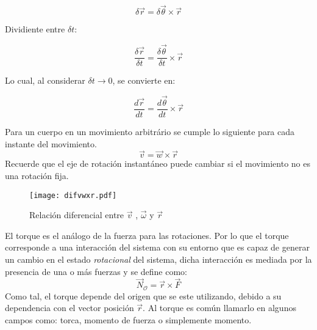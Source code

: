 \documentclass[/home/hernan-barquero/Documents/Apuntes_mecanica_teorica/main.tex]{subfiles}
\begin{document}
	\begin{equation*}
		\delta \vec{r} = \delta \vec{\theta} \times \vec{r}
	\end{equation*}

	Dividiente entre $\delta t$:

	\begin{equation*}
		\frac{\delta \vec{r}}{\delta t} =\frac{\delta \vec{\theta}}{\delta t}  \times \vec{r}
	\end{equation*}

	Lo cual, al considerar $\delta t \rightarrow 0$, se convierte en:

	\begin{equation*}
		\frac{d \vec{r}}{dt} = \frac{d \vec{\theta}}{dt} \times \vec{r}
	\end{equation*}

	\begin{definition}
		Para un cuerpo en un movimiento arbitrário se cumple lo siguiente para cada instante del movimiento.
		\begin{equation}
			\vec{v} = \vec{w} \times \vec{r}
			\label{eq: vwrelation}
		\end{equation}
		Recuerde que el eje de rotación instantáneo puede cambiar si el movimiento no es una rotación fija.
	\end{definition}


	\begin{marginfigure}
		\begin{figure}[H]
			\texttt{[image: difvwxr.pdf]}
			\caption{Relación diferencial entre $\vec{v}$ , $\vec{\omega}$ y $\vec{r}$}
			\label{fig: difvwxr}
		\end{figure}
	\end{marginfigure}

	\begin{definition}
		El torque es el análogo de la fuerza para las rotaciones. Por lo que el torque corresponde a una interacción del sistema con su entorno que es capaz de generar un cambio en el estado \textit{rotacional} del sistema, dicha interacción es mediada por la presencia de una o más fuerzas y se define como:
		\begin{equation}
			\vec{N}_{\mathcal{O}} = \vec{r} \times \vec{F}
			\label{eq: torque}
		\end{equation}
		Como tal, el torque depende del origen que se este utilizando, debido a su dependencia con el vector posición $\vec{r}$. Al torque es común llamarlo en algunos campos como: torca, momento de fuerza o simplemente momento.
	\end{definition}
\end{document}
